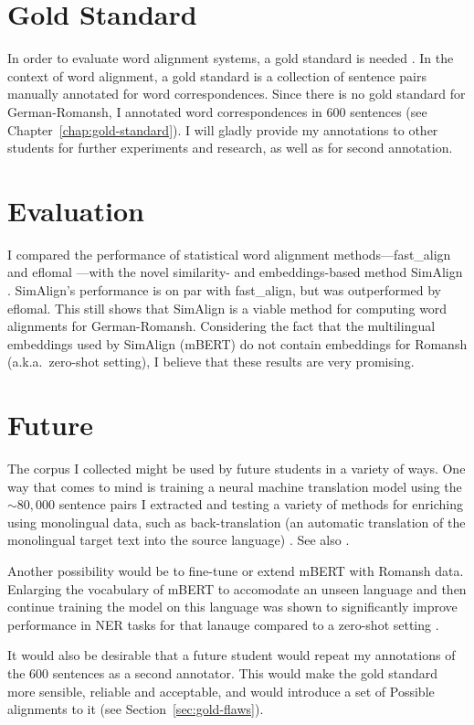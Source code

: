\section{Gold Standard}
In order to evaluate word alignment systems, a gold standard is needed \autocite[115]{koehn2009}. 
In the context of word alignment, a gold standard is a collection of sentence pairs manually annotated for word correspondences. 
Since there is no gold standard for German-Romansh, I annotated word correspondences in 600 sentences (see Chapter~\ref{chap:gold-standard}). I will  gladly provide my annotations to other students for further experiments and research, as well as for second annotation.  

\section{Evaluation}
I compared the performance of statistical word alignment methods---fast\_align \autocite{dyer-etal-2013-simple} and eflomal \autocite{Ostling2016efmaral}---with the novel similarity- and embeddings-based method SimAlign \autocite{jalili-sabet-etal-2020-simalign}. 
SimAlign's performance is on par with fast\_align, but was outperformed by eflomal. 
This still shows that SimAlign is a viable method for computing word alignments for German-Romansh. 
Considering the fact that the multilingual embeddings used by SimAlign (mBERT) do not contain embeddings for Romansh (a.k.a.~zero-shot setting), I believe that these results are very promising.

\section{Future}
The corpus I collected might be used by future students in a variety of ways. 
One way that comes to mind is training a neural machine translation model using the $\sim80,000$ sentence pairs I extracted and testing a variety of methods for enriching using monolingual data, such as back-translation (an automatic translation of the monolingual target text into the source language) \autocite{sennrich-etal-2016-improving}. 
See also \cite{https://doi.org/10.48550/arxiv.2107.04239}.

Another possibility would be to fine-tune or extend mBERT with Romansh data. 
Enlarging the vocabulary of mBERT to accomodate an unseen language and then continue training the model on this language was shown to significantly improve performance in  NER tasks for that lanauge compared to a zero-shot setting \autocite{wang-etal-2020-extending}. 

It would also be desirable that a future student would repeat my annotations of the 600 sentences as a second annotator. 
This would make the gold standard more sensible, reliable and acceptable, and would introduce a set of Possible alignments to it (see Section~\ref{sec:gold-flaws}).




